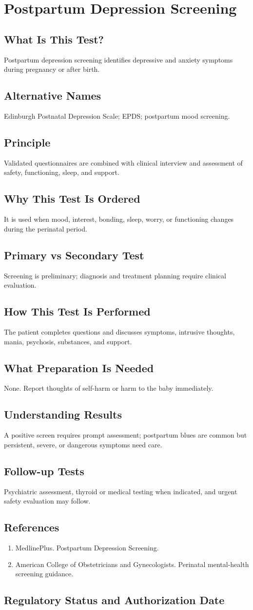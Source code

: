 \chapter{Postpartum Depression Screening}
\section*{What Is This Test?} Postpartum depression screening identifies depressive and anxiety symptoms during pregnancy or after birth.\section*{Alternative Names} Edinburgh Postnatal Depression Scale; EPDS; postpartum mood screening.\section*{Principle} Validated questionnaires are combined with clinical interview and assessment of safety, functioning, sleep, and support.\section*{Why This Test Is Ordered} It is used when mood, interest, bonding, sleep, worry, or functioning changes during the perinatal period.\section*{Primary vs Secondary Test} Screening is preliminary; diagnosis and treatment planning require clinical evaluation.\section*{How This Test Is Performed} The patient completes questions and discusses symptoms, intrusive thoughts, mania, psychosis, substances, and support.\section*{What Preparation Is Needed} None. Report thoughts of self-harm or harm to the baby immediately.\section*{Understanding Results} A positive screen requires prompt assessment; postpartum blues are common but persistent, severe, or dangerous symptoms need care.\section*{Follow-up Tests} Psychiatric assessment, thyroid or medical testing when indicated, and urgent safety evaluation may follow.\section*{References} \begin{enumerate}\item MedlinePlus. Postpartum Depression Screening.\item American College of Obstetricians and Gynecologists. Perinatal mental-health screening guidance.\end{enumerate}\clearpage\section*{Regulatory Status and Authorization Date}\clearpage
